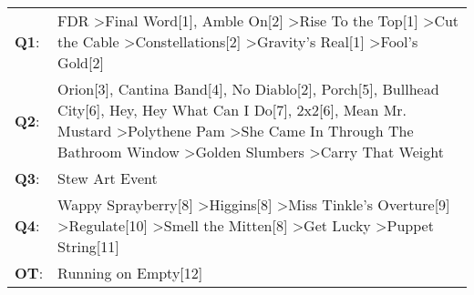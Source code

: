 \begin{supertabular}{p{0.03\textwidth}p{0.92\textwidth}}
 \textbf{Q1}:  &                                                                                                                                                                                  FDR\textsuperscript{} \textgreater \enspace Final Word[1]\textsuperscript{}, \enspace Amble On[2]\textsuperscript{} \textgreater \enspace Rise To the Top[1]\textsuperscript{} \textgreater \enspace Cut the Cable\textsuperscript{} \textgreater \enspace Constellations[2]\textsuperscript{} \textgreater \enspace Gravity's Real[1]\textsuperscript{} \textgreater \enspace Fool's Gold[2]\textsuperscript{}  \enspace  \\
 \textbf{Q2}:  &  Orion[3]\textsuperscript{}, \enspace Cantina Band[4]\textsuperscript{}, \enspace No Diablo[2]\textsuperscript{}, \enspace Porch[5]\textsuperscript{}, \enspace Bullhead City[6]\textsuperscript{}, \enspace Hey, Hey What Can I Do[7]\textsuperscript{}, \enspace 2x2[6]\textsuperscript{}, \enspace Mean Mr. Mustard\textsuperscript{} \textgreater \enspace Polythene Pam\textsuperscript{} \textgreater \enspace She Came In Through The Bathroom Window\textsuperscript{} \textgreater \enspace Golden Slumbers\textsuperscript{} \textgreater \enspace Carry That Weight\textsuperscript{}  \enspace  \\
 \textbf{Q3}:  &                                                                                                                                                                                                                                                                                                                                                                                                                                                                                                                                                                 Stew Art Event\textsuperscript{}  \enspace  \\
 \textbf{Q4}:  &                                                                                                                                                                                                          Wappy Sprayberry[8]\textsuperscript{} \textgreater \enspace Higgins[8]\textsuperscript{} \textgreater \enspace Miss Tinkle's Overture[9]\textsuperscript{} \textgreater \enspace Regulate[10]\textsuperscript{} \textgreater \enspace Smell the Mitten[8]\textsuperscript{} \textgreater \enspace Get Lucky\textsuperscript{} \textgreater \enspace Puppet String[11]\textsuperscript{}  \enspace  \\
 \textbf{OT}:  &                                                                                                                                                                                                                                                                                                                                                                                                                                                                                                                                                           Running on Empty[12]\textsuperscript{}  \enspace  \\
\end{supertabular}
